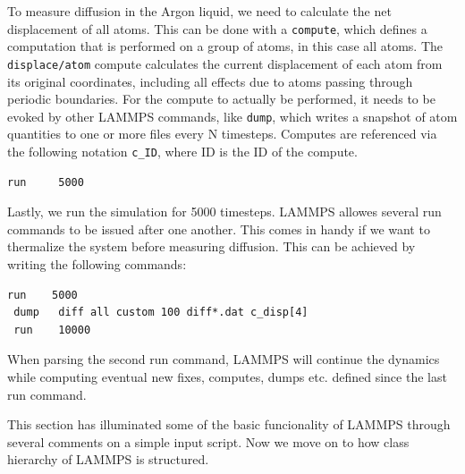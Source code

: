 \documentclass[twoside,english]{uiofysmaster}
\begin{document}
To measure diffusion in the 
Argon liquid, we need to calculate the net
displacement of all atoms. This can be done with a 
\texttt{compute}, which defines a computation that is 
performed on a group of atoms, in this case all atoms.
The \texttt{displace/atom} compute calculates the current
displacement of each atom from its original
coordinates, including all effects due to atoms
passing through periodic boundaries.
For the compute to actually be performed, it needs
to be evoked by other LAMMPS commands, like \texttt{dump}, 
which writes a snapshot of atom quantities to one 
or more files every N timesteps. Computes are 
referenced via the following notation \texttt{c\_ID}, where
ID is the ID of the compute. 
\begin{lstlisting}[style=lammps]
run		5000
\end{lstlisting}
Lastly, we run the simulation for 5000 timesteps. 
LAMMPS allowes several run commands to be issued
after one another. This comes in handy if we want
to thermalize the system before measuring diffusion.
This can be achieved by writing the following commands:
\begin{lstlisting}[style=lammps]
 run 	5000
 dump 	diff all custom 100 diff*.dat c_disp[4]
 run 	10000
\end{lstlisting}
When parsing the second run command, LAMMPS will
continue the dynamics while computing eventual
new fixes, computes, dumps etc. defined since
the last run command. 

This section has illuminated some of the basic
funcionality of LAMMPS through several comments
on a simple input script. Now we move on to
how class hierarchy of LAMMPS is structured. 
\end{document}
